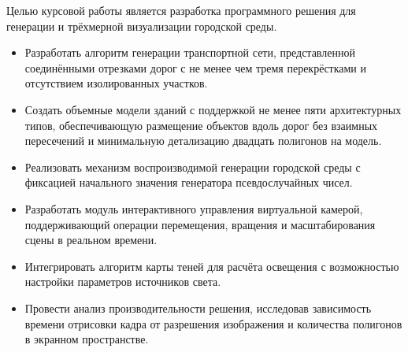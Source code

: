 
Целью курсовой работы является разработка программного решения для генерации и трёхмерной визуализации городской среды.
\begin{itemize}
    \item Разработать алгоритм генерации транспортной сети, представленной соединёнными отрезками дорог с не менее чем тремя перекрёстками и отсутствием изолированных участков.
    \item Создать объемные модели зданий с поддержкой не менее пяти архитектурных типов, обеспечивающую размещение объектов вдоль дорог без взаимных пересечений и минимальную детализацию двадцать полигонов на модель.
    \item Реализовать механизм воспроизводимой генерации городской среды с фиксацией начального значения генератора псевдослучайных чисел.
    \item Разработать модуль интерактивного управления виртуальной камерой, поддерживающий операции перемещения, вращения и масштабирования сцены в реальном времени.
    \item Интегрировать алгоритм карты теней для расчёта освещения с возможностью настройки параметров источников света.
    \item Провести анализ производительности решения, исследовав зависимость времени отрисовки кадра от разрешения изображения и количества полигонов в экранном пространстве.
\end{itemize}

\clearpage